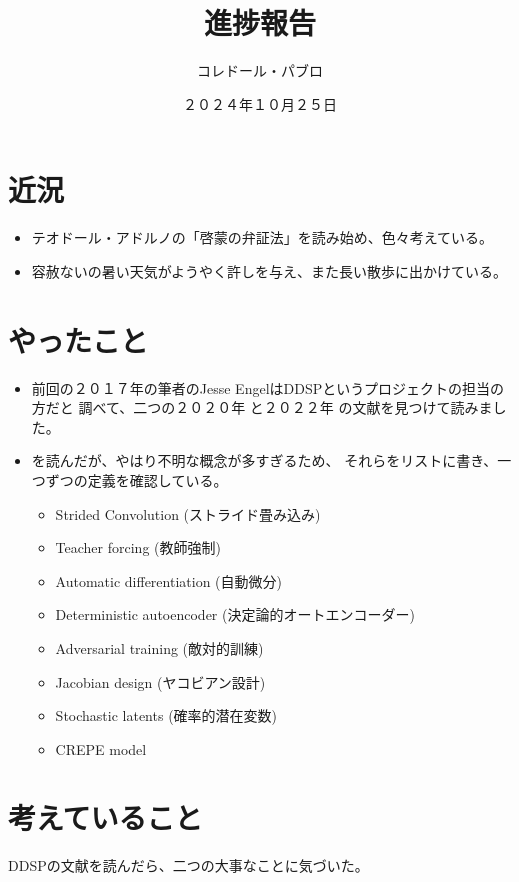 \documentclass[a4paper, 12pt]{article}
\title{進捗報告}
\author{コレドール・パブロ}
\date{２０２４年１０月２５日}
\begin{document}
\maketitle

\section*{近況}
\begin{itemize}
    \item テオドール・アドルノの「啓蒙の弁証法」を読み始め、色々考えている。
    \item 容赦ないの暑い天気がようやく許しを与え、また長い散歩に出かけている。
\end{itemize} 

\section*{やったこと}
\begin{itemize}
    \item 前回の２０１７年の筆者のJesse EngelはDDSPというプロジェクトの担当の方だと
    調べて、二つの２０２０年\cite{DDSP} と２０２２年\cite{DDSP2022} の文献を見つけて読みました。
    \item \cite{DDSP2022}を読んだが、やはり不明な概念が多すぎるため、
    それらをリストに書き、一つずつの定義を確認している。
    \begin{itemize}
        \item Strided Convolution (ストライド畳み込み)
        \item Teacher forcing (教師強制)
        \item Automatic differentiation (自動微分)
        \item Deterministic autoencoder (決定論的オートエンコーダー)
        \item Adversarial training (敵対的訓練)
        \item Jacobian design (ヤコビアン設計)
        \item Stochastic latents (確率的潜在変数)
        \item CREPE model
    \end{itemize}
    
\end{itemize}

\section*{考えていること}
DDSPの文献を読んだら、二つの大事なことに気づいた。
\end{document}
